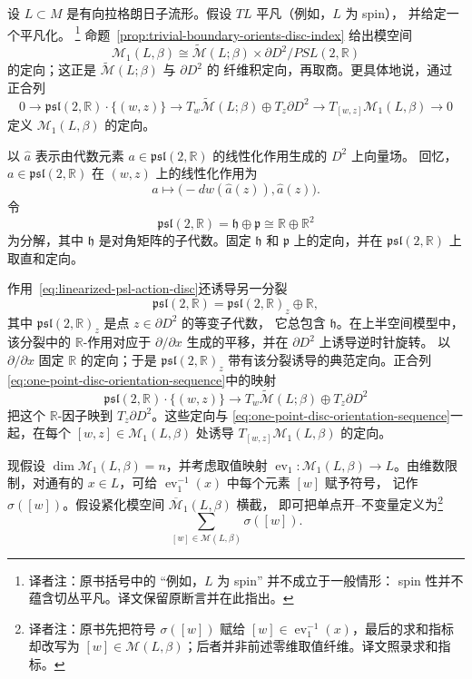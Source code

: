 \begin{example}
\label{ex:one-point-open-gw-invariant}
设 $L\subset M$ 是有向拉格朗日子流形。假设 $TL$ 平凡（例如，$L$ 为 spin），
并给定一个平凡化。
\footnote{译者注：原书括号中的 ``例如，$L$ 为 spin'' 并不成立于一般情形：
spin 性并不蕴含切丛平凡。译文保留原断言并在此指出。}
命题~\ref{prop:trivial-boundary-orients-disc-index} 给出模空间
\[
 \mathcal M_1(L,\beta)
 \cong\widetilde{\mathcal M}(L;\beta)\times\partial D^2/PSL(2,\mathbb R)
\]
的定向；这正是 $\widetilde{\mathcal M}(L;\beta)$ 与 $\partial D^2$ 的
纤维积定向，再取商。更具体地说，通过正合列
\begin{equation}
 0\to\mathfrak{psl}(2,\mathbb R)\cdot\{(w,z)\}
 \to T_w\widetilde{\mathcal M}(L;\beta)\oplus T_z\partial D^2
 \to T_{[w,z]}\mathcal M_1(L,\beta)\to0
 \label{eq:one-point-disc-orientation-sequence}
\end{equation}
定义 $\mathcal M_1(L,\beta)$ 的定向。

以 $\widehat a$ 表示由\personLie{}代数元素
$a\in\mathfrak{psl}(2,\mathbb R)$ 的线性化作用生成的 $D^2$ 上向量场。
回忆，$a\in\mathfrak{psl}(2,\mathbb R)$ 在 $(w,z)$ 上的线性化作用为
\begin{equation}
 a\longmapsto\bigl(-dw(\widehat a(z)),\widehat a(z)\bigr).
 \label{eq:linearized-psl-action-disc}
\end{equation}
令
\[
 \mathfrak{psl}(2,\mathbb R)=\mathfrak h\oplus\mathfrak p
 \cong\mathbb R\oplus\mathbb R^2
\]
为\personCartan{}分解，其中 $\mathfrak h$ 是对角矩阵的\personLie{}子代数。固定
$\mathfrak h$ 和 $\mathfrak p$ 上的定向，并在
$\mathfrak{psl}(2,\mathbb R)$ 上取直和定向。

作用~\eqref{eq:linearized-psl-action-disc}还诱导另一分裂
\[
 \mathfrak{psl}(2,\mathbb R)=\mathfrak{psl}(2,\mathbb R)_z\oplus\mathbb R,
\]
其中 $\mathfrak{psl}(2,\mathbb R)_z$ 是点 $z\in\partial D^2$ 的等变\personLie{}子代数，
它总包含 $\mathfrak h$。在上半空间模型中，该分裂中的 $\mathbb R$-作用对应于
$\partial/\partial x$ 生成的平移，并在 $\partial D^2$ 上诱导逆时针旋转。
以 $\partial/\partial x$ 固定 $\mathbb R$ 的定向；于是
$\mathfrak{psl}(2,\mathbb R)_z$ 带有该分裂诱导的典范定向。正合列
\eqref{eq:one-point-disc-orientation-sequence}中的映射
\[
 \mathfrak{psl}(2,\mathbb R)\cdot\{(w,z)\}
 \longrightarrow T_w\widetilde{\mathcal M}(L;\beta)\oplus T_z\partial D^2
\]
把这个 $\mathbb R$-因子映到 $T_z\partial D^2$。这些定向与
\eqref{eq:one-point-disc-orientation-sequence}一起，在每个
$[w,z]\in\mathcal M_1(L,\beta)$ 处诱导 $T_{[w,z]}\mathcal M_1(L,\beta)$ 的定向。

现假设 $\dim\mathcal M_1(L,\beta)=n$，并考虑取值映射
$\operatorname{ev}_1:\mathcal M_1(L,\beta)\to L$。由维数限制，对通有的
$x\in L$，可给 $\operatorname{ev}_1^{-1}(x)$ 中每个元素 $[w]$ 赋予符号，
记作 $\sigma([w])$。假设紧化模空间 $\overline{\mathcal M}_1(L,\beta)$ 横截，
即可把单点开\personGromov{}--\personWitten{}不变量定义为\footnote{译者注：原书先把符号
$\sigma([w])$ 赋给 $[w]\in\operatorname{ev}_1^{-1}(x)$，最后的求和指标却改写为
$[w]\in\mathcal M(L,\beta)$；后者并非前述零维取值纤维。译文照录求和指标。}
\[
 \sum_{[w]\in\mathcal M(L,\beta)}\sigma([w]).
\]
\end{example}
